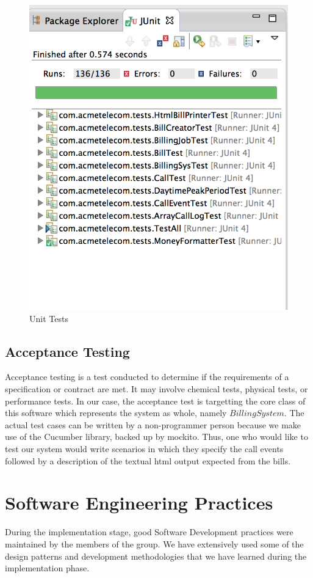 \documentclass[11pt,twocolumn]{article} %
\begin{document}
\begin{figure}[!ht]
\centering
\includegraphics[scale=0.40]{cod_pro_analytix.png}
\caption{Unit Tests}
\end{figure}

\subsection{Acceptance Testing}
Acceptance testing is a test conducted to determine if the requirements of a specification or contract are met. 
It may involve chemical tests, physical tests, or performance tests.
In our case, the acceptance test is targetting the core class of this software which represents the system as whole, namely $BillingSystem$.
The actual test cases can be written by a non-programmer person because we make use of the Cucumber library, backed up by mockito.
Thus, one who would like to test our system would write scenarios in which they specify the call events followed by a description
of the textual html output expected from the bills.

\section{Software Engineering Practices}
During the implementation stage, good Software Development practices were maintained by the members of the group. 
We have extensively used some of the design patterns and development methodologies that we have learned during the implementation phase.
\end{document}
